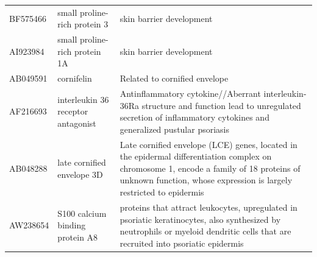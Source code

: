 \documentclass[10pt,a4paper]{article}
\begin{document}
\begin{table}[]
\begin{tabular}{l|p{4.5cm} p{8.5cm}}
		BF575466           & small proline-rich protein 3                                                                                            & skin barrier development\cite{kainu2009association}                                                                                                                                                                                                                  \\
		AI923984           & small proline-rich protein 1A                                                                                           & skin barrier development\cite{bergboer2012genetics}                                                                                                                                                                                                                  \\
		AB049591           & cornifelin                                                                                                              & Related to cornified envelope\cite{michibata2004identification}                                                                                                                                                                                                             \\
		AF216693           & interleukin 36 receptor antagonist                                                                                      & Antinflammatory cytokine//Aberrant interleukin-36Ra structure and function lead to unregulated secretion of inflammatory cytokines and generalized pustular psoriasis\cite{marrakchi2011interleukin}                                                                     \\
		AB048288           & late cornified envelope 3D                                                                                              & Late cornified envelope (LCE) genes, located in the epidermal differentiation complex on chromosome 1, encode a family of 18 proteins of unknown function, whose expression is largely restricted to epidermis\cite{niehues2017psoriasis}                             \\
		AW238654           & S100 calcium binding protein A8                                                                                         & proteins that attract leukocytes, upregulated in psoriatic keratinocytes, also synthesized by neutrophils or myeloid dendritic cells that are recruited into psoriatic epidermis\cite{roberson2010psoriasis}                                                           \\

\end{tabular}
\end{table}
\end{document}
